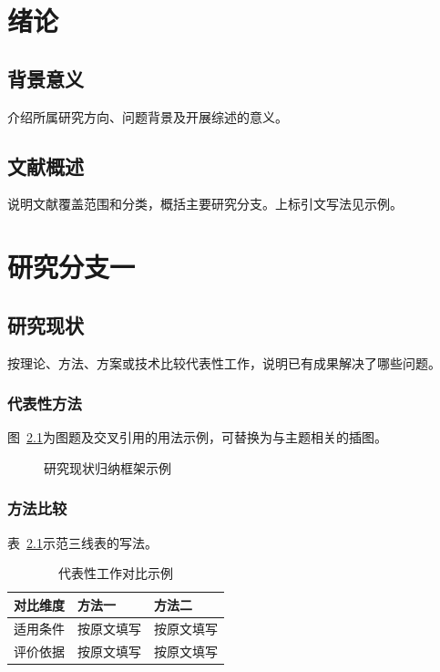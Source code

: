 \chapter{绪论}

\section{背景意义}
介绍所属研究方向、问题背景及开展综述的意义。

\section{文献概述}
说明文献覆盖范围和分类，概括主要研究分支。上标引文写法见示例\cite{sample-book,sample-article}。

\chapter{研究分支一}

\section{研究现状}
按理论、方法、方案或技术比较代表性工作，说明已有成果解决了哪些问题。

\subsection{代表性方法}
图~\ref{fig:review-framework}为图题及交叉引用的用法示例，可替换为与主题相关的插图。

\begin{figure}[htbp]
  \centering
  \caption{研究现状归纳框架示例}
  \label{fig:review-framework}
\end{figure}

\subsection{方法比较}
表~\ref{tab:review-comparison}示范三线表的写法。

\begin{table}[htbp]
  \centering
  \caption{代表性工作对比示例}
  \label{tab:review-comparison}
  \begin{MasterTable}
  \begin{tabular}{@{}lll@{}}
    \toprule
    对比维度 & 方法一 & 方法二 \\
    \midrule
    适用条件 & 按原文填写 & 按原文填写 \\
    评价依据 & 按原文填写 & 按原文填写 \\
    \bottomrule
  \end{tabular}
  \end{MasterTable}
\end{table}

